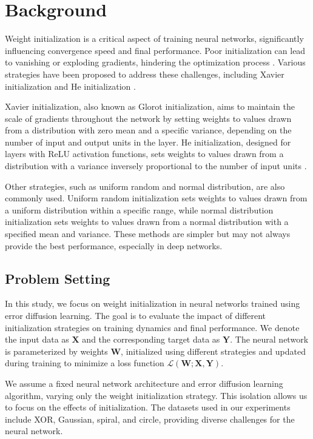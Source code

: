 \documentclass{article} %
\begin{document}
\section{Background}
\label{sec:background}

Weight initialization is a critical aspect of training neural networks, significantly influencing convergence speed and final performance. Poor initialization can lead to vanishing or exploding gradients, hindering the optimization process \citep{goodfellow2016deep}. Various strategies have been proposed to address these challenges, including Xavier initialization and He initialization \citep{he2015delving}.

Xavier initialization, also known as Glorot initialization, aims to maintain the scale of gradients throughout the network by setting weights to values drawn from a distribution with zero mean and a specific variance, depending on the number of input and output units in the layer. He initialization, designed for layers with ReLU activation functions, sets weights to values drawn from a distribution with a variance inversely proportional to the number of input units \citep{He2015DelvingDI}.

Other strategies, such as uniform random and normal distribution, are also commonly used. Uniform random initialization sets weights to values drawn from a uniform distribution within a specific range, while normal distribution initialization sets weights to values drawn from a normal distribution with a specified mean and variance. These methods are simpler but may not always provide the best performance, especially in deep networks.

\subsection{Problem Setting}
In this study, we focus on weight initialization in neural networks trained using error diffusion learning. The goal is to evaluate the impact of different initialization strategies on training dynamics and final performance. We denote the input data as \( \mathbf{X} \) and the corresponding target data as \( \mathbf{Y} \). The neural network is parameterized by weights \( \mathbf{W} \), initialized using different strategies and updated during training to minimize a loss function \( \mathcal{L}(\mathbf{W}; \mathbf{X}, \mathbf{Y}) \).

We assume a fixed neural network architecture and error diffusion learning algorithm, varying only the weight initialization strategy. This isolation allows us to focus on the effects of initialization. The datasets used in our experiments include XOR, Gaussian, spiral, and circle, providing diverse challenges for the neural network.
\end{document}
